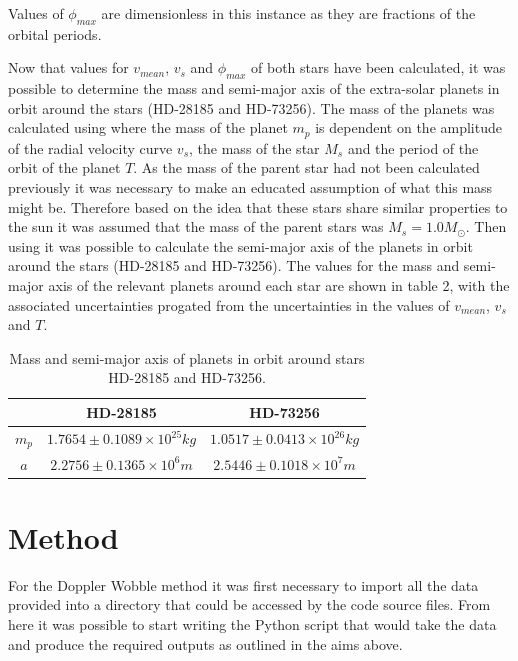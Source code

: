 \documentclass[]{article}
\begin{document}
Values of $\phi_{max}$ are dimensionless in this instance as they are
fractions of the orbital periods.
\par
Now that values for $v_{mean}$, $v_{s}$ and $\phi_{max}$ of both stars have 
been calculated, it was possible to determine the mass and semi-major axis of the
extra-solar planets in orbit around the stars (HD-28185 and HD-73256).
The mass of the planets was calculated using %
where the mass of the planet $m_p $ is dependent on the amplitude of the radial 
velocity curve $v_{s}$, the mass of the star $M_s$ and the period of the orbit of the planet $T$.
As the mass of the parent star had not been calculated previously it was necessary to
make an educated assumption of what this mass might be. Therefore based on the idea 
that these stars share similar properties to the sun it was assumed that the mass of
the parent stars was $M_s = 1.0M_{\odot}$. Then using %
it was possible to calculate the semi-major axis of the planets in orbit around the
stars (HD-28185 and HD-73256). The values for the mass and semi-major axis of the 
relevant planets around each star are shown in table 2, with the associated 
uncertainties progated from the uncertainties in the values of $v_{mean}$, $v_{s}$
and $T$.

\begin{table}[h!]
    \begin{center}
      \caption{Mass and semi-major axis of planets in orbit around stars HD-28185 and HD-73256.}
      \label{tab:table2}
      \begin{tabular}{c|c|c}
         & {HD-28185} & {HD-73256} \\
        \hline
        $m_p$ & $1.7654\pm0.1089\times10^{25}kg$ & $1.0517\pm0.0413\times10^{26}kg$ \\
        \hline
        $a$ & $2.2756\pm0.1365\times10^{6}m$ & $2.5446\pm0.1018\times10^{7}m$\\
        
      \end{tabular}
    \end{center}
  \end{table}
  \par
  





\section*{Method}
For the Doppler Wobble method it was first necessary to 
import all the data provided into a directory that could be 
accessed by the code source files. From here it was possible to start
writing the Python script that would take the data and produce the required 
outputs as outlined in the aims above.
\end{document}

